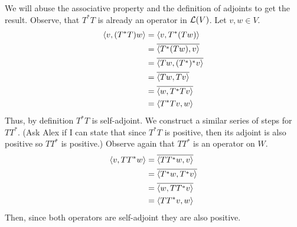 \documentclass[10pt, twocolumn]{article}
\begin{document}
\begin{q}[4]
    We will abuse the associative property and the definition of adjoints to get the result. 
    Observe, that $ T^*T $ is already an operator in $ \mathcal{L}(V) $. Let $ v, w \in V $.
    \begin{align*}
        \langle v, (T^* T) w\rangle &= \langle v, T^* (Tw)\rangle \\
        &= \overline{ \langle T^* (Tw), v\rangle } \\
        &= \overline{\langle Tw, (T^*)^* v\rangle} \\
        &= \overline{\langle Tw, Tv\rangle} \\
        &= \overline{\langle w, T^*Tv\rangle} \\
        &= \langle T^* Tv, w\rangle
    \end{align*}
    Thus, by definition $ T^*T $ is self-adjoint.
    We construct a similar series of steps for $ TT^* $. 
    (Ask Alex if I can state that since $ T^*T $ is positive, then its adjoint is also positive so $ TT^* $ is positive.)
    Observe again that $ TT^* $ is an operator on $ W $. 
    \begin{align*}
        \langle v, TT^* w\rangle &= \overline{\langle TT^* w, v\rangle} \\
        &= \overline{\langle T^* w, T^* v\rangle} \\
        &= \overline{\langle w, TT^* v\rangle} \\
        &= \langle TT^* v, w\rangle
    \end{align*}
    Then, since both operators are self-adjoint they are also positive. 
\end{q}
\end{document}
